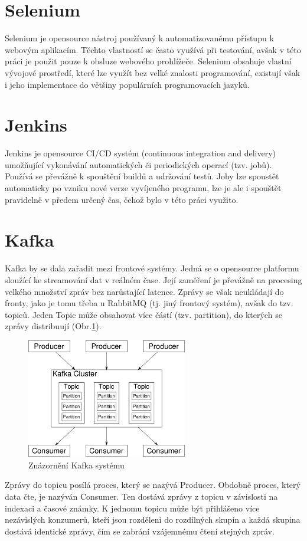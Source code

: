 \documentclass[thesis=M,czech,hidelinks]{FITthesis}[2013/05/06]
\begin{document}
\section{Selenium} \label{sec:selenium}
Selenium je opensource nástroj používaný k automatizovanému přístupu k webovým aplikacím. Těchto vlastností se často využívá při testování, avšak v této práci je použit pouze k obsluze webového prohlížeče. Selenium obsahuje vlastní vývojové prostředí, které lze využít bez velké znalosti programování, existují však i jeho implementace do většiny populárních programovacích jazyků.


\section{Jenkins}
Jenkins je opensource CI/CD systém (continuous integration and delivery) umožňující vykonávání automatických či periodických operací (tzv. jobů). Používá se převážně k spouštění buildů a udržování testů. Joby lze spoustět automaticky po vzniku nové verze vyvíjeného programu, lze je ale i spouštět pravidelně v předem určený čas, čehož bylo v této práci využito.

\section{Kafka}\label{sec:kafka}
Kafka by se dala zařadit mezi frontové systémy. Jedná se o opensource platformu sloužící ke streamování dat v reálném čase. Její zaměření je převážně na procesing velkého množství zpráv bez narůstající latence. Zprávy se však neukládají do fronty, jako je tomu třeba u RabbitMQ (tj. jiný frontový systém), avšak do tzv. topiců. Jeden Topic může obsahovat více částí (tzv. partition), do kterých se zprávy distribuují (Obr.\ref{fig:kafka}). 
\begin{figure}[h]
	\centering
	\includegraphics[width=7cm]{pictures/kafka.png}
	\caption{Znázornění Kafka systému \cite{kafka}}
	\label{fig:kafka}
\end{figure}
Zprávy do topicu posílá proces, který se nazývá Producer. Obdobně proces, který data čte, je nazýván Consumer. Ten dostává zprávy z topicu v závislosti na indexaci a časové známky. K jednomu topicu může být přihlášeno více nezávislých konzumerů, kteří jsou rozděleni do rozdílných skupin a každá skupina dostává identické zprávy, čím se zabrání vzájemnému čtení stejných zpráv.
\end{document}
